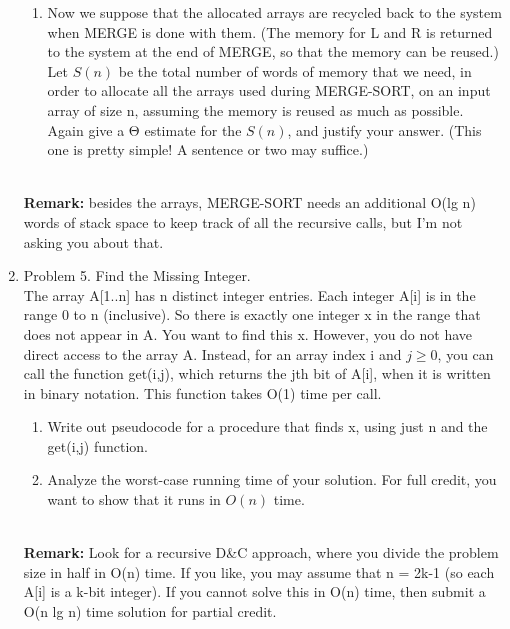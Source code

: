 \documentclass[11pt]{article}
\begin{document}
\begin{enumerate}
\begin{enumerate}
        \item Now we suppose that the allocated arrays are recycled back to the system when MERGE is done with them. (The memory for L and R is returned to the system at the end of MERGE, so that the memory can be reused.) Let $S(n)$ be the total number of words of memory that we need, in order to allocate all the arrays used during MERGE-SORT, on an input array of size n, assuming the memory is reused as much as possible. Again give a Θ estimate for the $S(n)$, and justify your answer. (This one is pretty simple! A sentence or two may suffice.)

    \end{enumerate}
        \\
        \textbf{Remark: }besides the arrays, MERGE-SORT needs an additional O(lg n) words of stack space to keep track of all the recursive calls, but I'm not asking you about that.

\item Problem 5. Find the Missing Integer.\\
The array A[1..n] has n distinct integer entries. Each integer A[i] is in the range 0 to n (inclusive). So there is exactly one integer x in the range that does not appear in A. You want to find this x. However, you do not have direct access to the array A. Instead, for an array index i and $j≥0$, you can call the function get(i,j), which returns the jth bit of A[i], when it is written in binary notation. This function takes O(1) time per call.
    \begin{enumerate}
        \item Write out pseudocode for a procedure that finds x, using just n and the get(i,j) function.

        \item Analyze the worst-case running time of your solution. For full credit, you want to show that it runs in $O(n)$ time.
    \end{enumerate}

        \\
        \textbf{Remark: }Look for a recursive D&C approach, where you divide the problem size in half in O(n) time. If you like, you may assume that n = 2k-1 (so each A[i] is a k-bit integer). If you cannot solve this in O(n) time, then submit a O(n lg n) time solution for partial credit.


\end{enumerate}
\end{document}
